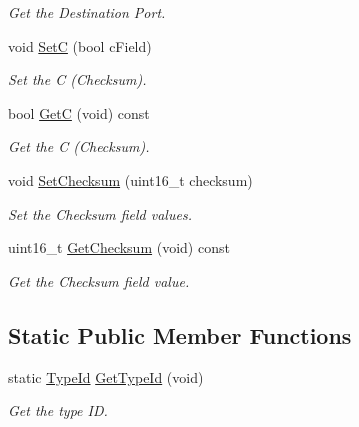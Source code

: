 \begin{DoxyCompactItemize}
\begin{DoxyCompactList}\small\item\em Get the Destination Port. \end{DoxyCompactList}\item 
void \hyperlink{classns3_1_1SixLowPanUdpNhcExtension_acf00146657670bf729a25b22fb16a7cf}{SetC} (bool c\+Field)
\begin{DoxyCompactList}\small\item\em Set the C (Checksum). \end{DoxyCompactList}\item 
bool \hyperlink{classns3_1_1SixLowPanUdpNhcExtension_af77596ca462c68584795fbe2de91e50e}{GetC} (void) const 
\begin{DoxyCompactList}\small\item\em Get the C (Checksum). \end{DoxyCompactList}\item 
void \hyperlink{classns3_1_1SixLowPanUdpNhcExtension_abed42dfdb3164681c2209ad3d4d56fa8}{Set\+Checksum} (uint16\+\_\+t checksum)
\begin{DoxyCompactList}\small\item\em Set the Checksum field values. \end{DoxyCompactList}\item 
uint16\+\_\+t \hyperlink{classns3_1_1SixLowPanUdpNhcExtension_ab557104fbf1c98520f2d6ea0ad01c407}{Get\+Checksum} (void) const 
\begin{DoxyCompactList}\small\item\em Get the Checksum field value. \end{DoxyCompactList}\end{DoxyCompactItemize}
\subsection*{Static Public Member Functions}
\begin{DoxyCompactItemize}
\item 
static \hyperlink{classns3_1_1TypeId}{Type\+Id} \hyperlink{classns3_1_1SixLowPanUdpNhcExtension_ac35609f3d17a4116cd7f8a87db14b366}{Get\+Type\+Id} (void)
\begin{DoxyCompactList}\small\item\em Get the type ID. \end{DoxyCompactList}\end{DoxyCompactItemize}
